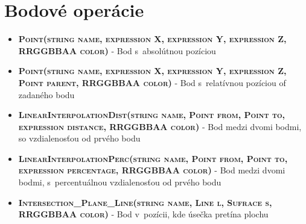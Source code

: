 \section*{Bodové operácie}
\begin{itemize}


\item \textsc{\textbf{Point(string name, expression X, expression Y, expression Z, RRGGBBAA color)}} - Bod s~absolútnou pozíciou 
\item \textsc{\textbf{Point(string name, expression X, expression Y, expression Z, Point parent, RRGGBBAA color)}} - Bod s~relatívnou pozíciou of zadaného bodu

\item \textsc{\textbf{LinearInterpolationDist(string name, Point from, Point to, expression distance, RRGGBBAA color)}} - Bod medzi dvomi bodmi, so vzdialenosťou od prvého bodu
		 
\item \textsc{\textbf{LinearInterpolationPerc(string name, Point from, Point to, expression percentage, RRGGBBAA color)}} - Bod medzi dvomi bodmi, s~percentuálnou vzdialenosťou od prvého bodu

\item \textsc{\textbf{Intersection\_Plane\_Line(string name, Line l, Sufrace s, RRGGBBAA color)}} - Bod v~pozícii, kde úsečka pretína plochu %



\end{itemize}
